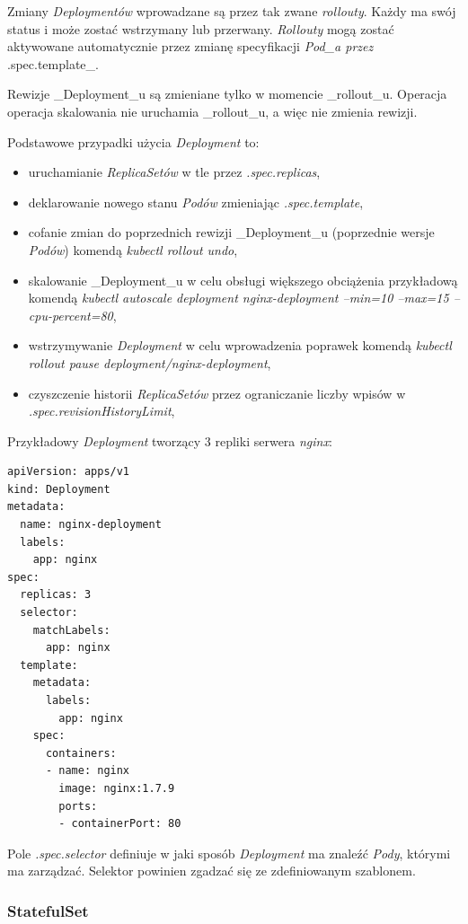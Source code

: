 \documentclass[a4paper,12pt,twoside,openany]{report}
\providecommand{\tightlist}{%
  \setlength{\itemsep}{0pt}\setlength{\parskip}{0pt}}
\begin{document}
Zmiany \emph{Deploymentów} wprowadzane są przez tak zwane
\emph{rollouty}. Każdy ma swój status i może zostać wstrzymany lub
przerwany. \emph{Rollouty} mogą zostać aktywowane automatycznie przez
zmianę specyfikacji \emph{Pod\_a przez }.spec.template\_.

Rewizje \_Deployment\_u są zmieniane tylko w momencie \_rollout\_u.
Operacja operacja skalowania nie uruchamia \_rollout\_u, a więc nie
zmienia rewizji.

Podstawowe przypadki użycia \emph{Deployment} to:

\begin{itemize}
\tightlist
\item
  uruchamianie \emph{ReplicaSetów} w tle przez \emph{.spec.replicas},
\item
  deklarowanie nowego stanu \emph{Podów} zmieniając
  \emph{.spec.template},
\item
  cofanie zmian do poprzednich rewizji \_Deployment\_u (poprzednie
  wersje \emph{Podów}) komendą \emph{kubectl rollout undo},
\item
  skalowanie \_Deployment\_u w celu obsługi większego obciążenia
  przykładową komendą \emph{kubectl autoscale deployment
  nginx-deployment --min=10 --max=15 --cpu-percent=80},
\item
  wstrzymywanie \emph{Deployment} w celu wprowadzenia poprawek komendą
  \emph{kubectl rollout pause deployment/nginx-deployment},
\item
  czyszczenie historii \emph{ReplicaSetów} przez ograniczanie liczby
  wpisów w \emph{.spec.revisionHistoryLimit},
\end{itemize}

Przykładowy \emph{Deployment} tworzący 3 repliki serwera \emph{nginx}:

\begin{lstlisting}
apiVersion: apps/v1
kind: Deployment
metadata:
  name: nginx-deployment
  labels:
    app: nginx
spec:
  replicas: 3
  selector:
    matchLabels:
      app: nginx
  template:
    metadata:
      labels:
        app: nginx
    spec:
      containers:
      - name: nginx
        image: nginx:1.7.9
        ports:
        - containerPort: 80
\end{lstlisting}

Pole \emph{.spec.selector} definiuje w jaki sposób \emph{Deployment} ma
znaleźć \emph{Pody}, którymi ma zarządzać. Selektor powinien zgadzać się
ze zdefiniowanym szablonem.

\hypertarget{statefulset}{%
\subsubsection{StatefulSet}\label{statefulset}}
\end{document}
